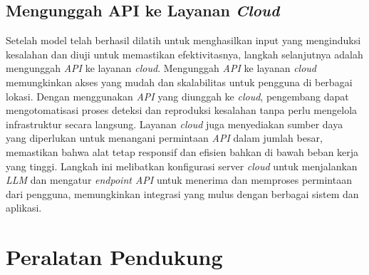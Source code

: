   \subsection{Mengunggah API ke Layanan \emph{Cloud}}
  \label{subsec:mengunggahapikelayanancloud}
  Setelah model telah berhasil dilatih untuk menghasilkan 
  input yang menginduksi kesalahan dan diuji untuk memastikan 
  efektivitasnya, langkah selanjutnya adalah mengunggah 
  \emph{API} ke layanan \emph{cloud}. Mengunggah \emph{API} 
  ke layanan \emph{cloud} memungkinkan akses yang mudah dan 
  skalabilitas untuk pengguna di berbagai lokasi. Dengan 
  menggunakan \emph{API} yang diunggah ke \emph{cloud}, 
  pengembang dapat mengotomatisasi proses deteksi dan 
  reproduksi kesalahan tanpa perlu mengelola infrastruktur 
  secara langsung. Layanan \emph{cloud} juga menyediakan 
  sumber daya yang diperlukan untuk menangani permintaan 
  \emph{API} dalam jumlah besar, memastikan bahwa alat 
  tetap responsif dan efisien bahkan di bawah beban kerja 
  yang tinggi. Langkah ini melibatkan konfigurasi server 
  \emph{cloud} untuk menjalankan \emph{LLM} dan mengatur 
  \emph{endpoint API} untuk menerima dan memproses permintaan 
  dari pengguna, memungkinkan integrasi yang mulus dengan 
  berbagai sistem dan aplikasi.


\section{Peralatan Pendukung}
\label{sec:peralatan pendukung}

